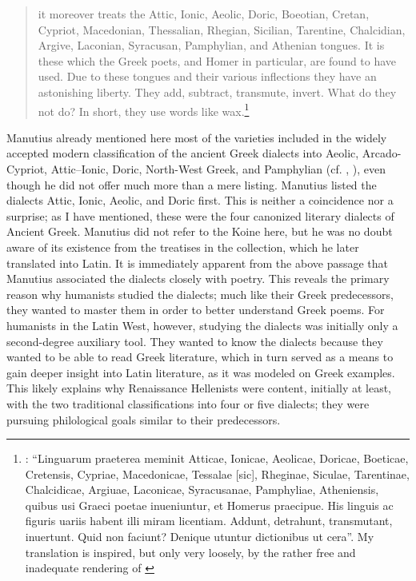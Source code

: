 \begin{quote}
it moreover treats the Attic, Ionic, Aeolic, Doric, Boeotian, Cretan, Cypriot, Macedonian, Thessalian, Rhegian, Sicilian, Tarentine, Chalcidian, Argive, Laconian, Syracusan, Pamphylian, and Athenian tongues. It is these which the Greek poets, and Homer in particular, are found to have used. Due to these tongues and their various inflections they have an astonishing liberty. They add, subtract, transmute, invert. What do they not do? In short, they use words like wax.\footnote{\citet[*.ii\textsc{\textsuperscript{v}}]{Manutius1496Aldus}: “Linguarum praeterea meminit Atticae, Ionicae, Aeolicae, Doricae, Boeticae, Cretensis, Cypriae, Macedonicae, Tessalae [sic], Rheginae, Siculae, Tarentinae, Chalcidicae, Argiuae, Laconicae, Syracusanae, Pamphyliae, Atheniensis, quibus usi Graeci poetae inueniuntur, et Homerus praecipue. His linguis ac figuris uariis habent illi miram licentiam. Addunt, detrahunt, transmutant, inuertunt. Quid non faciunt? Denique utuntur dictionibus ut cera”. My translation is inspired, but only very loosely, by the rather free and inadequate rendering of \citet[12]{Bean1958}} 
\end{quote}

Manutius already mentioned here most of the varieties included in the widely accepted modern classification of the ancient Greek dialects into Aeolic, Arcado-Cypriot, Attic–Ionic, Doric, North-West Greek, and Pamphylian (cf. , ), even though he did not offer much more than a mere listing. Manutius listed the dialects Attic, Ionic, Aeolic, and Doric first. This is neither a coincidence nor a surprise; as I have mentioned, these were the four canonized literary dialects of Ancient Greek. Manutius did not refer to the Koine here, but he was no doubt aware of its existence from the treatises in the collection, which he later translated into Latin. It is immediately apparent from the above passage that Manutius associated the dialects closely with poetry. This reveals the primary reason why humanists studied the dialects; much like their Greek predecessors, they wanted to master them in order to better understand Greek poems. For humanists in the Latin West, however, studying the dialects was initially only a second-degree auxiliary tool. They wanted to know the dialects because they wanted to be able to read Greek literature, which in turn served as a means to gain deeper insight into Latin literature, as it was modeled on Greek examples. This likely explains why Renaissance Hellenists were content, initially at least, with the two traditional classifications into four or five dialects; they were pursuing philological goals similar to their predecessors.

